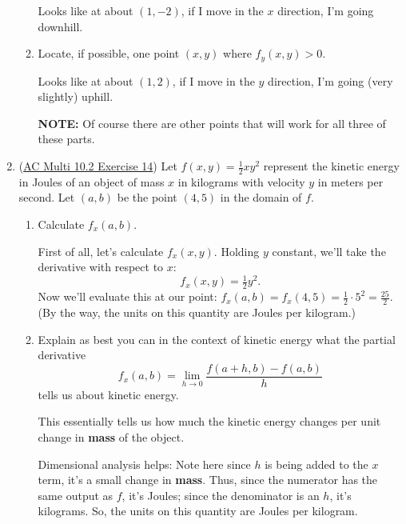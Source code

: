 \documentclass[10pt]{article}
\newenvironment{red}{\color{red}}{\ignorespacesafterend}
\begin{document}
\begin{enumerate}[leftmargin=0pt]
\begin{enumerate}
    \begin{red}
    Looks like at about $(1,-2)$, if I move in the $x$ direction, I'm going downhill.
    \end{red}
    
    \item Locate, if possible, one point $(x,y)$ where $f_y(x,y)>0$.
    
    \begin{red}
    Looks like at about $(1,2)$, if I move in the $y$ direction, I'm going (very slightly) uphill.
    
    \textbf{NOTE:} Of course there are other points that will work for all three of these parts.
    \end{red}

\end{enumerate}

\item (\href{https://activecalculus.org/multi/S-10-2-First-Order-Partial-Derivatives.html#Ez_10_2_1_5}{AC Multi 10.2 Exercise 14}) Let $f(x, y) = \tfrac{1}{2}xy^2$ represent the kinetic energy in Joules of an object of mass $x$ in kilograms with velocity $y$ in meters per second. Let $(a, b)$ be the point $(4,5)$ in the domain of $f$.
    \begin{enumerate}
        \item Calculate $f_x(a,b)$.
        
        \begin{red}
            First of all, let's calculate $f_x(x,y).$ Holding $y$ constant, we'll take the derivative with respect to $x$:
            \[f_x(x,y) = \tfrac{1}{2}y^2.\]
            Now we'll evaluate this at our point: $f_x(a, b) = f_x(4, 5) = \tfrac{1}{2}\cdot 5^2 = \tfrac{25}{2}.$
            (By the way, the units on this quantity are Joules per kilogram.)
        \end{red}
        \item Explain as best you can in the context of kinetic energy what the partial derivative
        \[f_{x}(a, b)=\lim _{h \rightarrow 0} \frac{f(a+h, b)-f(a, b)}{h}\]
        tells us about kinetic energy.
        
        \begin{red}
            This essentially tells us how much the kinetic energy changes per unit change in \textbf{mass} of the object. 
            
            Dimensional analysis helps: Note here since $h$ is being added to the $x$ term, it's a small change in \textbf{mass}. Thus, since the numerator has the same output as $f$, it's Joules; since the denominator is an $h$, it's kilograms. So, the units on this quantity are Joules per kilogram.
        \end{red}
        

\end{enumerate}
\end{enumerate}
\end{document}
